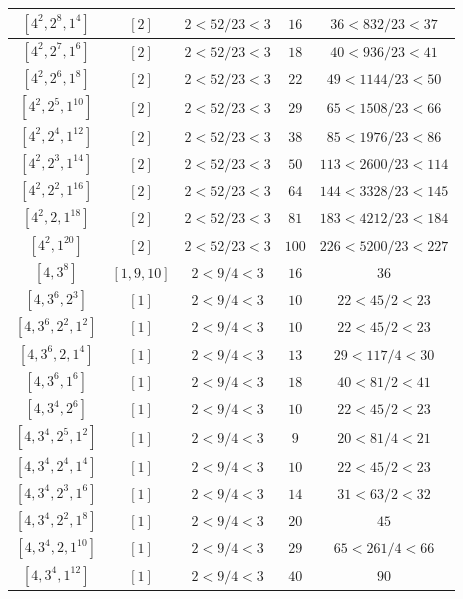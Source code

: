 \documentclass{article}%
\begin{document}
\begin{center}
\begin{longtable}{||c|c|c|c|c||}
$[4^{2}, 2^{8}, 1^{4}]$ & $[2]$ & $2 < 52/23 < 3$ & $16$ & $36 < 832/23 < 37$ \\ \hline 
$[4^{2}, 2^{7}, 1^{6}]$ & $[2]$ & $2 < 52/23 < 3$ & $18$ & $40 < 936/23 < 41$ \\ \hline 
$[4^{2}, 2^{6}, 1^{8}]$ & $[2]$ & $2 < 52/23 < 3$ & $22$ & $49 < 1144/23 < 50$ \\ \hline 
$[4^{2}, 2^{5}, 1^{10}]$ & $[2]$ & $2 < 52/23 < 3$ & $29$ & $65 < 1508/23 < 66$ \\ \hline 
$[4^{2}, 2^{4}, 1^{12}]$ & $[2]$ & $2 < 52/23 < 3$ & $38$ & $85 < 1976/23 < 86$ \\ \hline 
$[4^{2}, 2^{3}, 1^{14}]$ & $[2]$ & $2 < 52/23 < 3$ & $50$ & $113 < 2600/23 < 114$ \\ \hline 
$[4^{2}, 2^{2}, 1^{16}]$ & $[2]$ & $2 < 52/23 < 3$ & $64$ & $144 < 3328/23 < 145$ \\ \hline 
$[4^{2}, 2, 1^{18}]$ & $[2]$ & $2 < 52/23 < 3$ & $81$ & $183 < 4212/23 < 184$ \\ \hline 
$[4^{2}, 1^{20}]$ & $[2]$ & $2 < 52/23 < 3$ & $100$ & $226 < 5200/23 < 227$ \\ \hline 
$[4, 3^{8}]$ & $[1, 9, 10]$ & $2 < 9/4 < 3$ & $16$ & $36$ \\ \hline 
$[4, 3^{6}, 2^{3}]$ & $[1]$ & $2 < 9/4 < 3$ & $10$ & $22 < 45/2 < 23$ \\ \hline 
$[4, 3^{6}, 2^{2}, 1^{2}]$ & $[1]$ & $2 < 9/4 < 3$ & $10$ & $22 < 45/2 < 23$ \\ \hline 
$[4, 3^{6}, 2, 1^{4}]$ & $[1]$ & $2 < 9/4 < 3$ & $13$ & $29 < 117/4 < 30$ \\ \hline 
$[4, 3^{6}, 1^{6}]$ & $[1]$ & $2 < 9/4 < 3$ & $18$ & $40 < 81/2 < 41$ \\ \hline 
$[4, 3^{4}, 2^{6}]$ & $[1]$ & $2 < 9/4 < 3$ & $10$ & $22 < 45/2 < 23$ \\ \hline 
$[4, 3^{4}, 2^{5}, 1^{2}]$ & $[1]$ & $2 < 9/4 < 3$ & $9$ & $20 < 81/4 < 21$ \\ \hline 
$[4, 3^{4}, 2^{4}, 1^{4}]$ & $[1]$ & $2 < 9/4 < 3$ & $10$ & $22 < 45/2 < 23$ \\ \hline 
$[4, 3^{4}, 2^{3}, 1^{6}]$ & $[1]$ & $2 < 9/4 < 3$ & $14$ & $31 < 63/2 < 32$ \\ \hline 
$[4, 3^{4}, 2^{2}, 1^{8}]$ & $[1]$ & $2 < 9/4 < 3$ & $20$ & $45$ \\ \hline 
$[4, 3^{4}, 2, 1^{10}]$ & $[1]$ & $2 < 9/4 < 3$ & $29$ & $65 < 261/4 < 66$ \\ \hline 
$[4, 3^{4}, 1^{12}]$ & $[1]$ & $2 < 9/4 < 3$ & $40$ & $90$ \\ \hline 

\end{longtable}
\end{center}
\end{document}

